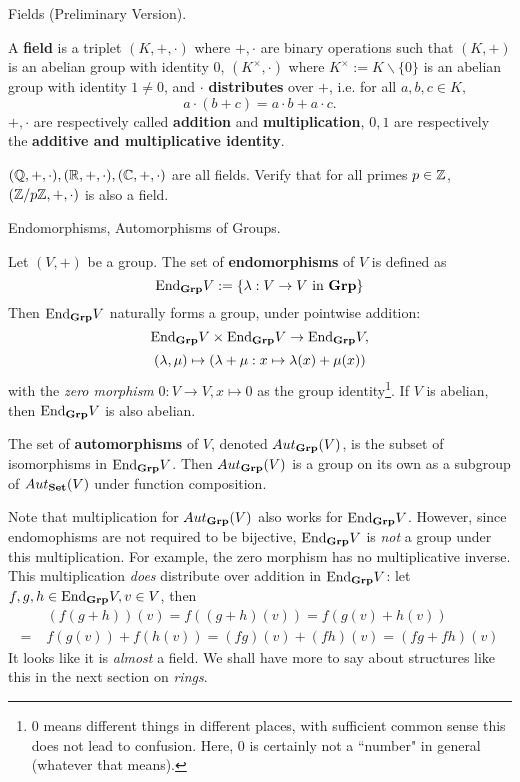 \documentclass[../../book.tex]{subfiles}
\begin{document}
\begin{dfn} Fields (Preliminary Version).

    A \textbf{field} is a triplet $(K,+,\cdot)$ where
    $+, \cdot$ are binary operations such that
    $(K,+)$ is an abelian group with identity $0$,
    $(K^\times,\cdot)$ where $K^\times := K\backslash\{0\}$
    is an abelian group with identity $1 \neq 0$,
    and $\cdot$ \textbf{distributes} over $+$, i.e. for all
    $a, b, c \in K,$ 
    \[a \cdot (b + c) = a \cdot b + a \cdot c.\]
    $+,\cdot$ are respectively called \textbf{addition} and \textbf{multiplication}, 
    $0, 1$ are respectively the \textbf{additive and multiplicative identity}. 
\end{dfn}

\begin{eg}
    $(\mathbb{Q},+,\cdot), (\mathbb{R},+,\cdot), (\mathbb{C},+,\cdot)$ are all fields. 
    Verify that for all primes $p \in \mathbb{Z}$, $(\mathbb{Z}/p\mathbb{Z},+,\cdot)$
    is also a field.
\end{eg}

\begin{dfn} Endomorphisms, Automorphisms of Groups.

    Let $(V,+)$ be a group. 
    The set of \textbf{endomorphisms} of $V$ is defined as
    \[ 
        \mathrm{End}_{\mathbf{Grp}}V := \{\lambda : V \to V \text{ in } \mathbf{Grp}\} 
    \]
    Then $\mathrm{End}_{\mathbf{Grp}}V$ naturally forms a group, under pointwise addition:
    \[
        \mathrm{End}_{\mathbf{Grp}}V \times \mathrm{End}_{\mathbf{Grp}}V \to \mathrm{End}_{\mathbf{Grp}}V, 
    \]
    \[
        (\lambda, \mu) \mapsto (\lambda + \mu : x \mapsto \lambda(x) + \mu(x))
    \]
    with the \emph{zero morphism} $0 : V \to V, 
    x \mapsto 0$ as the group identity\footnote{
    $0$ means different things in different places,
    with sufficient common sense this does not lead to confusion. 
    Here, $0$ is certainly not a ``number" in general 
    (whatever that means).}.
    If $V$ is abelian, then $\mathrm{End}_{\mathbf{Grp}}V$ is also abelian. 
    
    The set of \textbf{automorphisms} of $V$, denoted $Aut_{\mathbf{Grp}}(V)$, 
    is the subset of isomorphisms in $\mathrm{End}_{\mathbf{Grp}}V$. 
    Then $Aut_{\mathbf{Grp}}(V)$ is a group on its own
    as a subgroup of $Aut_{\mathbf{Set}}(V)$ under function composition. 
    
\end{dfn}

\begin{rmk}
    Note that multiplication for $Aut_{\mathbf{Grp}}(V)$ also works for $\mathrm{End}_{\mathbf{Grp}}V$.
    However, since endomophisms are not required to be bijective, 
    $\mathrm{End}_{\mathbf{Grp}}V$ is \emph{not} a group under this multiplication. 
    For example, the zero morphism has no multiplicative inverse. 
    This multiplication \emph{does} distribute over addition in $\mathrm{End}_{\mathbf{Grp}}V$: let $f, g, h \in \mathrm{End}_{\mathbf{Grp}}V, v \in V$, then
    \begin{align*}
        &(f(g + h))(v) = f((g+h)(v)) = f(g(v) + h(v)) \\
        =\;& f(g(v)) + f(h(v)) = (fg)(v) + (fh)(v) = (fg + fh)(v)
    \end{align*}
    It looks like it is \emph{almost} a field. 
    We shall have more to say about structures like this 
    in the next section on \emph{rings}. 
\end{rmk}
\end{document}
